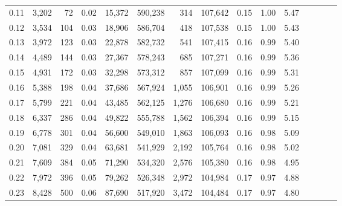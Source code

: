 \begin{tabular}{rrrcrrrrrrrrrrr}
0.11 &   3,202 &     72 &                                       0.02 &   15,372 &  590,238 &      314 &  107,642 &  0.15 &  1.00 &                         5.47 \\
0.12 &   3,534 &    104 &                                       0.03 &   18,906 &  586,704 &      418 &  107,538 &  0.15 &  1.00 &                         5.43 \\
0.13 &   3,972 &    123 &                                       0.03 &   22,878 &  582,732 &      541 &  107,415 &  0.16 &  0.99 &                         5.40 \\
0.14 &   4,489 &    144 &                                       0.03 &   27,367 &  578,243 &      685 &  107,271 &  0.16 &  0.99 &                         5.36 \\
0.15 &   4,931 &    172 &                                       0.03 &   32,298 &  573,312 &      857 &  107,099 &  0.16 &  0.99 &                         5.31 \\
0.16 &   5,388 &    198 &                                       0.04 &   37,686 &  567,924 &    1,055 &  106,901 &  0.16 &  0.99 &                         5.26 \\
0.17 &   5,799 &    221 &                                       0.04 &   43,485 &  562,125 &    1,276 &  106,680 &  0.16 &  0.99 &                         5.21 \\
0.18 &   6,337 &    286 &                                       0.04 &   49,822 &  555,788 &    1,562 &  106,394 &  0.16 &  0.99 &                         5.15 \\
0.19 &   6,778 &    301 &                                       0.04 &   56,600 &  549,010 &    1,863 &  106,093 &  0.16 &  0.98 &                         5.09 \\
0.20 &   7,081 &    329 &                                       0.04 &   63,681 &  541,929 &    2,192 &  105,764 &  0.16 &  0.98 &                         5.02 \\
0.21 &   7,609 &    384 &                                       0.05 &   71,290 &  534,320 &    2,576 &  105,380 &  0.16 &  0.98 &                         4.95 \\
0.22 &   7,972 &    396 &                                       0.05 &   79,262 &  526,348 &    2,972 &  104,984 &  0.17 &  0.97 &                         4.88 \\
0.23 &   8,428 &    500 &                                       0.06 &   87,690 &  517,920 &    3,472 &  104,484 &  0.17 &  0.97 &                         4.80 \\

\end{tabular}

